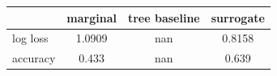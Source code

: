 \begin{tabular}{lccc}
\toprule
 & marginal & tree baseline & surrogate \\
\midrule
log loss & 1.0909 & nan & 0.8158 \\
accuracy & 0.433 & nan & 0.639 \\
\bottomrule
\end{tabular}
